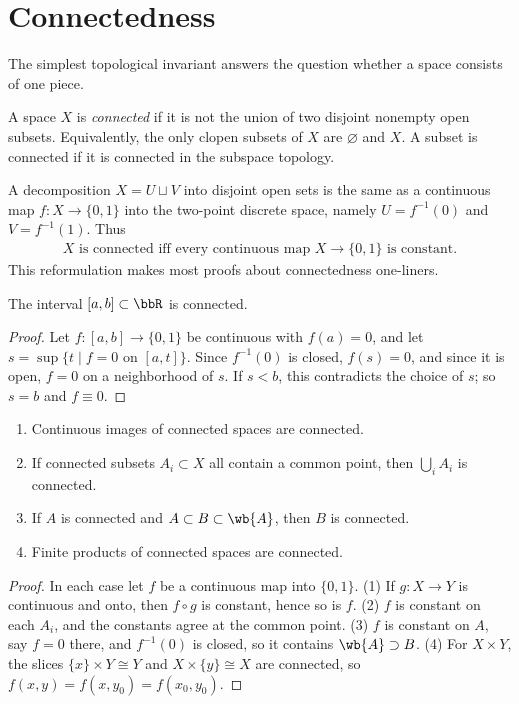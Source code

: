 \section{Connectedness}\label{sec: connectedness}

The simplest topological invariant answers the question whether a space consists of one piece.

\begin{defn}
    A space $X$ is \emph{connected} if it is not the union of two disjoint nonempty open subsets. Equivalently, the only clopen subsets of $X$ are $\varnothing$ and $X$. A subset is connected if it is connected in the subspace topology.
\end{defn}

A decomposition $X=U\sqcup V$ into disjoint open sets is the same as a continuous map $f:X\to\{0,1\}$ into the two-point discrete space, namely $U=f^{-1}(0)$ and $V=f^{-1}(1)$. Thus
\begin{gather*}
    \boxed{X \text{ is connected iff every continuous map } X\to\{0,1\} \text{ is constant.}}
\end{gather*}
This reformulation makes most proofs about connectedness one-liners.

\begin{thm}\label{thm interval connected}
    The interval $[a,b]\subset\bbR$ is connected.
\end{thm}
\begin{proof}
    Let $f:[a,b]\to\{0,1\}$ be continuous with $f(a)=0$, and let $s=\sup\{t\mid f=0\text{ on }[a,t]\}$. Since $f^{-1}(0)$ is closed, $f(s)=0$, and since it is open, $f=0$ on a neighborhood of $s$. If $s<b$, this contradicts the choice of $s$; so $s=b$ and $f\equiv0$.
\end{proof}

\begin{prop}\label{prop connected properties}
    \begin{enumerate}
        \item Continuous images of connected spaces are connected.
        \item If connected subsets $A_i\subset X$ all contain a common point, then $\bigcup_iA_i$ is connected.
        \item If $A$ is connected and $A\subset B\subset\wb{A}$, then $B$ is connected.
        \item Finite products of connected spaces are connected.
    \end{enumerate}
\end{prop}
\begin{proof}
    In each case let $f$ be a continuous map into $\{0,1\}$. (1) If $g:X\to Y$ is continuous and onto, then $f\circ g$ is constant, hence so is $f$. (2) $f$ is constant on each $A_i$, and the constants agree at the common point. (3) $f$ is constant on $A$, say $f=0$ there, and $f^{-1}(0)$ is closed, so it contains $\wb{A}\supset B$. (4) For $X\times Y$, the slices $\{x\}\times Y\cong Y$ and $X\times\{y\}\cong X$ are connected, so $f(x,y)=f(x,y_0)=f(x_0,y_0)$.
\end{proof}

